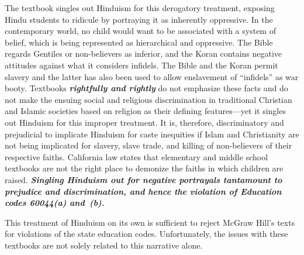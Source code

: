 The textbook singles out Hinduism for this derogatory treatment, exposing Hindu students to ridicule by portraying it as inherently oppressive. In the contemporary world, no child would want to be associated with a system of belief, which is being represented as hierarchical and oppressive. The Bible regards Gentiles or non-believers as inferior, and the Koran contains negative attitudes against what it considers infidels. The Bible and the Koran permit slavery and the latter has also been used to allow enslavement of “infidels” as war booty. Textbooks \textit{\textbf{rightfully and rightly}} do not emphasize these facts and do not make the ensuing social and religious discrimination in traditional Christian and Islamic societies based on religion as their defining features—yet it singles out Hinduism for this improper treatment. It is, therefore, discriminatory and prejudicial to implicate Hinduism for caste inequities if Islam and Christianity are not being implicated for slavery, slave trade, and killing of non-believers of their respective faiths. California law states that elementary and middle school textbooks are not the right place to demonize the faiths in which children are raised. \textit{\textbf{Singling Hinduism out for negative portrayals tantamount to prejudice and discrimination, and hence the violation of Education codes 60044(a) and~(b).}} 

This treatment of Hinduism on its own is sufficient to reject McGraw Hill’s texts for violations of the state education codes. Unfortunately, the issues with these textbooks are not solely related to this narrative alone.

